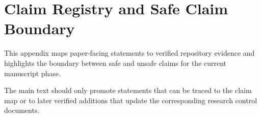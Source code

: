 \section{Claim Registry and Safe Claim Boundary}
\label{app:claim-registry}

This appendix maps paper-facing statements to verified repository evidence and highlights the
boundary between safe and unsafe claims for the current manuscript phase.



The main text should only promote statements that can be traced to the claim map or to later
verified additions that update the corresponding research control documents.
